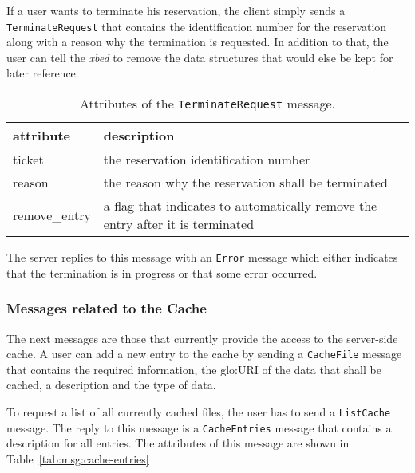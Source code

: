 If a  user wants to terminate  his reservation, the client  simply sends a
\texttt{TerminateRequest} that contains  the identification number for the
reservation  along with  a reason  why the  termination is  requested.  In
addition to  that, the user  can tell the  \emph{xbed} to remove  the data
structures that would else be kept for later reference.


\begin{table}[ht]
  \centering
  \begin{tabular}{@{}lp{}@{}}\toprule
    attribute        & \multicolumn{1}{l}{description} \\ \midrule %
    ticket           & the reservation identification number \\
    reason           & the reason why the reservation shall be terminated \\
    remove\_entry    & a flag that indicates to automatically remove the entry after it is terminated \\
    \bottomrule
  \end{tabular}
  \caption{Attributes of the \texttt{TerminateRequest} message.}
  \label{tab:msg:terminate-request}
\end{table}

The server  replies to this  message with an \texttt{Error}  message which
either indicates  that the termination is  in progress or  that some error
occurred.

\subsubsection{Messages related to the Cache}

The  next messages  are those  that currently  provide the  access  to the
server-side cache. A user  can add a new entry to the  cache by sending a
\texttt{CacheFile} message that contains the required information, \ie the
\gls{glo:URI} of the data that shall be cached, a description and the type
of data.

To request a  list of all currently  cached files, the user has  to send a
\texttt{ListCache}   message.    The   reply   to  this   message   is   a
\texttt{CacheEntries} message that contains a description for all entries.
The      attributes     of     this      message     are      shown     in
Table~\ref{tab:msg:cache-entries}

